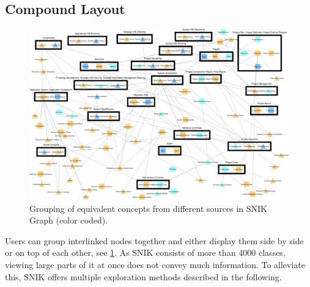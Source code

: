 \documentclass[conference]{IEEEtran}
\begin{document}
\subsection{Compound Layout}
\begin{figure}[h]
    \centering
    \includegraphics[width=\linewidth]{combine.pdf}
    \caption{Grouping of equivalent concepts from different sources in SNIK Graph (color coded).}%
	\label{fig:combine}
\end{figure}
\vspace{-3pt}

Users can group interlinked nodes together and either display them side by side or on top of each other, see \cref{fig:combine}.
As SNIK consists of more than 4000 classes, viewing large parts of it at once does not convey much information.%
To alleviate this, SNIK offers multiple exploration methods described in the following.
\end{document}

